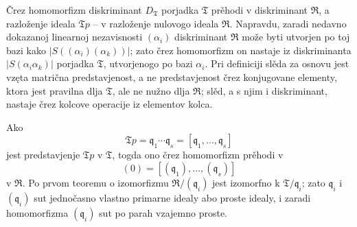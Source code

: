 \documentclass[11pt]{article}
\newcommand{\mT}{\mathfrak{T}}
\newcommand{\mR}{\mathfrak{R}}
\newcommand{\mq}{\mathfrak{q}}
\begin{document}
\setcounter{footnote}{28}

\noindent Črez homomorfizm diskriminant $D_\mT$ porjadka $\mT$ prěhodi v diskriminant $\mR$, a razloženje ideala $\mT p$ -- v razloženje nulovogo ideala $\mR$. Napravdu, zaradi nedavno dokazanoj linearnoj nezavisnosti $(\alpha_i)$ diskriminant $\mR$ može byti utvorjen po toj bazi kako $\left|S((\alpha_i)(\alpha_k))\right|$; zato črez homomorfizm on nastaje iz diskriminanta $\left|S(\alpha_i\alpha_k)\right|$ porjadka $\mT$, utvorjenogo po bazi $\alpha_i$. Pri definiciji slěda za osnovu jest vzęta matrična predstavjenost, a ne predstavjenost črez konjugovane elementy, ktora jest pravilna dlja $\mT$, ale ne nužno dlja $\mR$; slěd, a s njim i diskriminant, nastaje črez kolcove operacije iz elementov kolca.

Ako
\[
        \mT p=\mq_1\cdots\mq_s=[\mq_1,\ldots,\mq_s]
\]
jest predstavjenje $\mT p$ v $\mT$, togda ono črez homomorfizm prěhodi v
\[
        (0)=[(\mq_1),\ldots,(\mq_s)]
\]
v $\mR$. Po prvom teoremu o izomorfizmu $\mR/(\mq_i)$ jest izomorfno k $\mT/\mq_i$; zato $\mq_i$ i $(\mq_i)$ sut jednočasno vlastno primarne idealy abo proste idealy, i zaradi homomorfizma $(\mq_i)$ sut po parah vzajemno proste.
\end{document}
